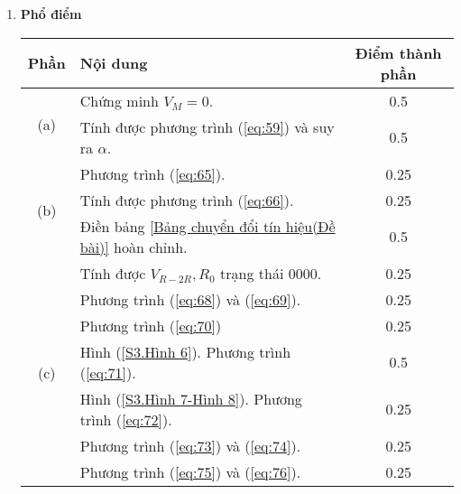 \begin{center}
\begin{enumerate}[label=(\alph*)]
\item 
\textbf{Phổ điểm}
    \begin{center}
    \begin{tabular}{|c|p{8cm}|c|}
    \hline
    \multicolumn{1}{|l|}{Phần} & Nội dung & Điểm thành phần \\ 
    \hline
\multirow{2}{*}{(a)} & Chứng minh $V_M=0$.                                                                                  & 0.5             \\ \cline{2-3}
                     & Tính được phương trình (\ref{eq:59}) và suy ra $\alpha$.   
                     & 0.5             \\ \hline
\multirow{3}{*}{(b)} & Phương trình (\ref{eq:65}).                               
                     & 0.25            \\ \cline{2-3}
                     & Tính được phương trình (\ref{eq:66}).                                           
                     & 0.25            \\ \cline{2-3}
                     & Điền bảng \ref{Bảng chuyển đổi tín hiệu(Đề bài)} hoàn chỉnh.                 
                     & 0.5             \\ \hline
\multirow{7}{*}{(c)} & Tính được $V_{R-2R}, R_0$ trạng thái $0000$.                                                                       & 0.25            \\ \cline{2-3}
                     & Phương trình (\ref{eq:68}) và (\ref{eq:69}).                
                     & 0.25            \\ \cline{2-3}
                     & Phương trình (\ref{eq:70})                                                   
                     & 0.25            \\ \cline{2-3}
                     & Hình (\ref{S3.Hình 6}). Phương trình (\ref{eq:71}).         
                     & 0.5             \\ \cline{2-3}
                     & Hình (\ref{S3.Hình 7-Hình 8}). Phương trình (\ref{eq:72}). 
                     & 0.25            \\ \cline{2-3}
                     & Phương trình (\ref{eq:73}) và (\ref{eq:74}).                
                     & 0.25            \\ \cline{2-3}
                     & Phương trình (\ref{eq:75}) và (\ref{eq:76}).                
                     & 0.25            \\ \hline
    \end{tabular}
    \end{center}
\end{enumerate}
\end{center}